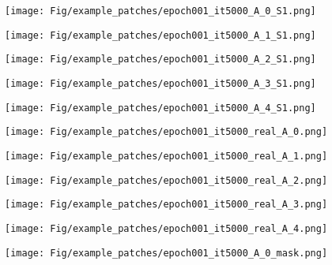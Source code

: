 \documentclass[journal]{IEEEtran}
\begin{document}
\begin{figure*}[h!tb]
  \centering
  \begin{subfigure}[b]{0.19\linewidth}
    \texttt{[image: Fig/example\_patches/epoch001\_it5000\_A\_0\_S1.png]}
  \end{subfigure}
  \begin{subfigure}[b]{0.19\linewidth}
    \texttt{[image: Fig/example\_patches/epoch001\_it5000\_A\_1\_S1.png]}
  \end{subfigure}
    \begin{subfigure}[b]{0.19\linewidth}
    \texttt{[image: Fig/example\_patches/epoch001\_it5000\_A\_2\_S1.png]}
  \end{subfigure}
      \begin{subfigure}[b]{0.19\linewidth}
    \texttt{[image: Fig/example\_patches/epoch001\_it5000\_A\_3\_S1.png]}
  \end{subfigure}
      \begin{subfigure}[b]{0.19\linewidth}
    \texttt{[image: Fig/example\_patches/epoch001\_it5000\_A\_4\_S1.png]}
  \end{subfigure}
\begin{subfigure}[b]{0.19\linewidth}
    \texttt{[image: Fig/example\_patches/epoch001\_it5000\_real\_A\_0.png]}
  \end{subfigure}
  \begin{subfigure}[b]{0.19\linewidth}
    \texttt{[image: Fig/example\_patches/epoch001\_it5000\_real\_A\_1.png]}
  \end{subfigure}
    \begin{subfigure}[b]{0.19\linewidth}
    \texttt{[image: Fig/example\_patches/epoch001\_it5000\_real\_A\_2.png]}
  \end{subfigure}
      \begin{subfigure}[b]{0.19\linewidth}
    \texttt{[image: Fig/example\_patches/epoch001\_it5000\_real\_A\_3.png]}
  \end{subfigure}
      \begin{subfigure}[b]{0.19\linewidth}
    \texttt{[image: Fig/example\_patches/epoch001\_it5000\_real\_A\_4.png]}
  \end{subfigure}
\begin{subfigure}[b]{0.19\linewidth}
    \texttt{[image: Fig/example\_patches/epoch001\_it5000\_A\_0\_mask.png]}
  \end{subfigure}
  \begin{subfigure}[b]{0.19\linewidth}

\end{subfigure}
\end{figure*}
\end{document}
